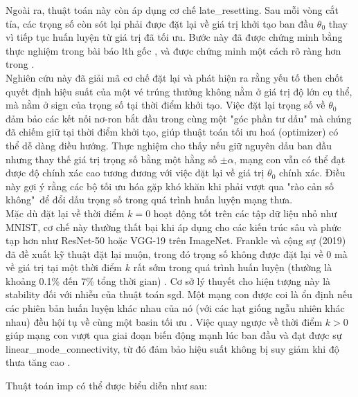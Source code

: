 Ngoài ra, thuật toán này còn áp dụng cơ chế \gls{late_resetting}. Sau mỗi vòng cắt tỉa, các trọng số còn sót lại phải được đặt lại về giá trị khởi tạo ban đầu $\theta_0$ thay vì tiếp tục huấn luyện từ giá trị đã tối ưu. Bước này đã được chứng minh bằng thực nghiệm trong bài báo \gls{lth} gốc \cite[p~.2]{imp}, và được chứng minh một cách rõ ràng hơn trong \cite{deconstructlth}. \\
Nghiên cứu này đã giải mã cơ chế đặt lại và phát hiện ra rằng yếu tố then chốt quyết định hiệu suất của một vé trúng thưởng không nằm ở giá trị độ lớn cụ thể, mà nằm ở \gls{sign} của trọng số tại thời điểm khởi tạo. Việc đặt lại trọng số về $\theta_0$ đảm bảo các kết nối nơ-ron bắt đầu trong cùng một "góc phần tư dấu" mà chúng đã chiếm giữ tại thời điểm khởi tạo, giúp thuật toán tối ưu hoá (optimizer) có thể dễ dàng điều hướng. Thực nghiệm cho thấy nếu giữ nguyên dấu ban đầu nhưng thay thế giá trị trọng số bằng một hằng số $\pm \alpha$, mạng con vẫn có thể đạt được độ chính xác cao tương đương với việc đặt lại về giá trị $\theta_0$ chính xác. Điều này gợi ý rằng các bộ tối ưu hóa gặp khó khăn khi phải vượt qua "rào cản số không"\ để đổi dấu trọng số trong quá trình huấn luyện mạng thưa. \\
Mặc dù đặt lại về thời điểm $k=0$ hoạt động tốt trên các tập dữ liệu nhỏ như MNIST, cơ chế này thường thất bại khi áp dụng cho các kiến trúc sâu và phức tạp hơn như ResNet-50 hoặc VGG-19 trên ImageNet. Frankle và cộng sự (2019) đã đề xuất kỹ thuật đặt lại muộn, trong đó trọng số không được đặt lại về 0 mà về giá trị tại một thời điểm $k$ rất sớm trong quá trình huấn luyện (thường là khoảng 0.1\% đến 7\% tổng thời gian) \cite{imp}. Cơ sở lý thuyết cho hiện tượng này là \gls{stability} \cite{deconstructlth} đối với nhiễu của thuật toán \gls{sgd}. Một mạng con được coi là ổn định nếu các phiên bản huấn luyện khác nhau của nó (với các hạt giống ngẫu nhiên khác nhau) đều hội tụ về cùng một \gls{basin} tối ưu \cite{imp}. Việc quay ngược về thời điểm $k > 0$ giúp mạng con vượt qua giai đoạn biến động mạnh lúc ban đầu và đạt được sự \gls{linear_mode_connectivity}, từ đó đảm bảo hiệu suất không bị suy giảm khi độ thưa tăng cao \cite[sec.~4]{lee2024revisiting}.

Thuật toán \gls{imp} có thể được biểu diễn như sau:

